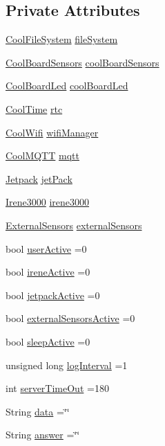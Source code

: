 \subsection*{Private Attributes}
\begin{DoxyCompactItemize}
\item 
\hyperlink{classCoolFileSystem}{Cool\+File\+System} \hyperlink{classCoolBoard_a42c2586fbb13ff7f06538e9284e8538d}{file\+System}
\item 
\hyperlink{classCoolBoardSensors}{Cool\+Board\+Sensors} \hyperlink{classCoolBoard_af102be5288bd7f7a8e59b13f86e26a00}{cool\+Board\+Sensors}
\item 
\hyperlink{classCoolBoardLed}{Cool\+Board\+Led} \hyperlink{classCoolBoard_a1b1d3c684a5baa56b08486e192fd8e97}{cool\+Board\+Led}
\item 
\hyperlink{classCoolTime}{Cool\+Time} \hyperlink{classCoolBoard_a50d2a6716879d64a85f3c6b44ad63275}{rtc}
\item 
\hyperlink{classCoolWifi}{Cool\+Wifi} \hyperlink{classCoolBoard_acd88e6003606b47479ebba81e4aceeca}{wifi\+Manager}
\item 
\hyperlink{classCoolMQTT}{Cool\+M\+Q\+TT} \hyperlink{classCoolBoard_a2399f44d7c23c1149a335cb3b46d90f1}{mqtt}
\item 
\hyperlink{classJetpack}{Jetpack} \hyperlink{classCoolBoard_a30b1357881b01ccbec676856a91e48e9}{jet\+Pack}
\item 
\hyperlink{classIrene3000}{Irene3000} \hyperlink{classCoolBoard_ad103718ce316006c4695b8eb312eaf11}{irene3000}
\item 
\hyperlink{classExternalSensors}{External\+Sensors} \hyperlink{classCoolBoard_a09e26264839c65873eb56af476eff6b2}{external\+Sensors}
\item 
bool \hyperlink{classCoolBoard_a6395459131d6889a3005f79c7a35e964}{user\+Active} =0
\item 
bool \hyperlink{classCoolBoard_a9c3f7ac625481ee2ae802a25d97a4ae0}{irene\+Active} =0
\item 
bool \hyperlink{classCoolBoard_a9be03a913d26e558328935ca3b59a75e}{jetpack\+Active} =0
\item 
bool \hyperlink{classCoolBoard_a638b00b76aeb819ecfd4c10b8cdd7bb7}{external\+Sensors\+Active} =0
\item 
bool \hyperlink{classCoolBoard_a0a51b2287139f66c738101fb53139230}{sleep\+Active} =0
\item 
unsigned long \hyperlink{classCoolBoard_a84bc94413b64973e4aba8c467c97006c}{log\+Interval} =1
\item 
int \hyperlink{classCoolBoard_a7a8d8d3d316220cdd049cd63c1aa8fe6}{server\+Time\+Out} =180
\item 
String \hyperlink{classCoolBoard_a427fb753dd8575bdf821c70a5c63d695}{data} =\char`\"{}\char`\"{}
\item 
String \hyperlink{classCoolBoard_a7b835fafd449e5282f7f91d787a2dc15}{answer} =\char`\"{}\char`\"{}
\end{DoxyCompactItemize}


